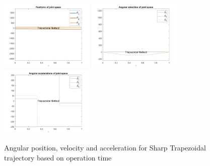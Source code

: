 \documentclass[conference]{IEEEtran}
\begin{document}
\begin{figure}[htbp]
    \centering
    \includegraphics[width=0.4\textwidth]{figures/prob5/theta_i/position_Trapezoidal Method.png}
    \includegraphics[width=0.4\textwidth]{figures/prob5/theta_i/velocity_Trapezoidal Method.png}
    \includegraphics[width=0.4\textwidth]{figures/prob5/theta_i/acceleration_Trapezoidal Method.png}
    \caption{Angular position, velocity and acceleration for Sharp Trapezoidal trajectory based on operation time}
    \label{fig:res3}
\end{figure}
\end{document}
